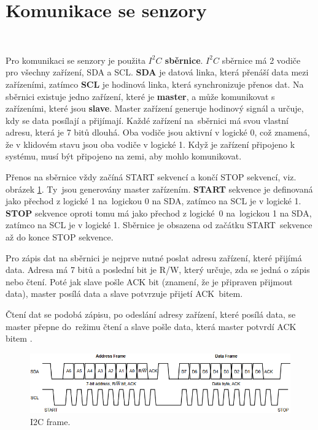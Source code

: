 \section{Komunikace se senzory}\

Pro komunikaci se senzory je použita \textbf{$I^2C$ sběrnice}. $I^2C$ sběrnice má 2
vodiče pro všechny zařízení, SDA a SCL. \textbf{SDA} je datová linka, která
přenáší data mezi zařízeními, zatímco \textbf{SCL} je hodinová linka, která
synchronizuje přenos dat. Na sběrnici existuje jedno zařízení, které je
\textbf{master}, a může komunikovat s zařízeními, které jsou \textbf{slave}. Master
zařízení generuje hodinový signál a určuje, kdy se data posílají a přijímají. Každé
zařízení na~sběrnici má svou vlastní adresu, která je 7 bitů dlouhá. Oba vodiče jsou
aktivní v logické 0, což znamená, že v klidovém stavu jsou oba vodiče v logické 1.
Když je zařízení připojeno k systému, musí být připojeno na zemi, aby mohlo
komunikovat.

Přenos na sběrnice vždy začíná START sekvencí a končí STOP sekvencí, viz. obrázek
\ref{fig:I2C_FRAME}. Ty~jsou generovány master zařízením. \textbf{START} sekvence je
definovaná jako přechod z logické 1 na~logickou 0 na SDA, zatímco na SCL je v
logické 1. \textbf{STOP} sekvence oproti tomu má jako přechod z logické~0
na~logickou 1 na SDA, zatímco na SCL je v logické 1. Sběrnice je obsazena od začátku
START~sekvence až do konce STOP sekvence.

Pro zápis dat na sběrnici je nejprve nutné poslat adresu zařízení, které přijímá
data. Adresa má 7 bitů a poslední bit je R/W, který určuje, zda se jedná o zápis
nebo čtení. Poté jak slave pošle ACK bit (znamení, že je připraven přijmout data),
master posílá data a slave potvrzuje přijetí ACK~bitem.

Čtení dat se podobá zápisu, po odeslání adresy zařízení, které posílá data, se
master přepne do~režimu čtení a slave pošle data, která master potvrdí ACK
bitem \cite{I2C}.

\begin{figure}[!h]
    \centering
    \includegraphics[width = .9\linewidth]{Figures/I2C_FRAME.png}
    \caption{I2C frame\cite{I2C}.}
    \label{fig:I2C_FRAME}
\end{figure}

